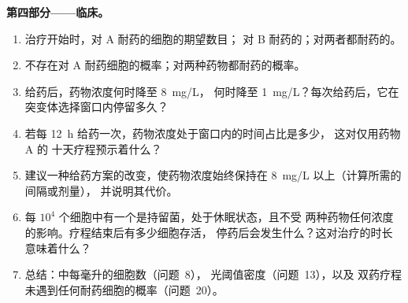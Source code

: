 \begin{problem}
\medskip
\noindent\textbf{第四部分——临床。}
\begin{enumerate}[resume]
  \item 治疗开始时，对 A 耐药的细胞的期望数目；
        对 B 耐药的；对两者都耐药的。
  \item 不存在对 A 耐药细胞的概率；对两种药物都耐药的概率。
  \item 给药后，药物浓度何时降至 \qty{8}{mg/L}，
        何时降至 \qty{1}{mg/L}？每次给药后，它在
        突变体选择窗口内停留多久？
  \item 若每 \qty{12}{h} 给药一次，药物浓度处于窗口内的时间占比是多少，
        这对仅用药物 A 的
        十天疗程预示着什么？
  \item 建议一种给药方案的改变，使药物浓度始终保持在
        \qty{8}{mg/L} 以上（计算所需的间隔或剂量），
        并说明其代价。
  \item 每 $10^{4}$ 个细胞中有一个是持留菌，处于休眠状态，且不受
        两种药物任何浓度的影响。疗程结束后有多少细胞存活，
        停药后会发生什么？这对治疗的时长
        意味着什么？
  \item 总结：中每毫升的细胞数（问题~8），
        光阈值密度（问题~13），以及
        双药疗程未遇到任何耐药细胞的概率（问题~20）。
\end{enumerate}
\end{problem}
